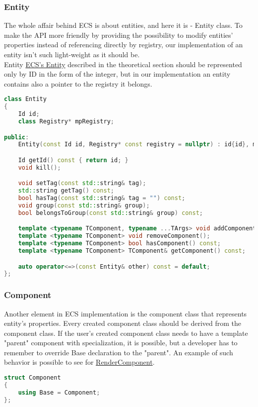 \newpage

\subsubsection{Entity}
The whole affair behind ECS is about entities, and here it is - Entity class.
To make the API more friendly by providing the possibility to modify entities' properties instead of referencing directly by registry, our implementation of an entity isn't such light-weight as it should be.\\
Entity \hyperref[sec:registry]{ECS's Entity} described in the theoretical section should be represented only by ID in the form of the integer, but in our implementation an entity contains also a pointer to the registry it belongs.
\begin{lstlisting}[language=c++, caption=Entity class (./engine/include/tsengine/ecs/ecs.h)]
class Entity
{
    Id id;
    class Registry* mpRegistry;

public:
    Entity(const Id id, Registry* const registry = nullptr) : id{id}, mpRegistry{registry} {}

    Id getId() const { return id; }
    void kill();

    void setTag(const std::string& tag);
    std::string getTag() const;
    bool hasTag(const std::string& tag = "") const;
    void group(const std::string& group);
    bool belongsToGroup(const std::string& group) const;

    template <typename TComponent, typename ...TArgs> void addComponent(TArgs&& ...args);
    template <typename TComponent> void removeComponent();
    template <typename TComponent> bool hasComponent() const;
    template <typename TComponent> TComponent& getComponent() const;

    auto operator<=>(const Entity& other) const = default;
};
\end{lstlisting}

\newpage

\subsubsection{Component}
Another element in ECS implementation is the component class that represents entity's properties.
Every created component class should be derived from the component class. If the user's created component class needs to have a template "parent" component with specialization, it is possible, but a developer has to remember to override Base declaration to the "parent". An example of such behavior is possible to see for \hyperref[sec:render_component]{RenderComponent}.
\begin{lstlisting}[language=c++, caption=Component classe (./engine/include/tsengine/ecs/ecs.h)]
struct Component
{
    using Base = Component;
};
\end{lstlisting}

